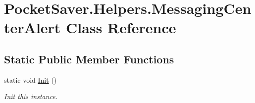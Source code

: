 \hypertarget{class_pocket_saver_1_1_helpers_1_1_messaging_center_alert}{}\section{Pocket\+Saver.\+Helpers.\+Messaging\+Center\+Alert Class Reference}
\label{class_pocket_saver_1_1_helpers_1_1_messaging_center_alert}
\subsection*{Static Public Member Functions}
\begin{DoxyCompactItemize}
\item 
static void \hyperlink{class_pocket_saver_1_1_helpers_1_1_messaging_center_alert_a19c73557967c32f25efc4e973998ab7f}{Init} ()
\begin{DoxyCompactList}\small\item\em Init this instance. \end{DoxyCompactList}\end{DoxyCompactItemize}
